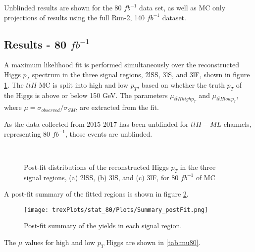 Unblinded results are shown for the 80 $fb^{-1}$ data set, as well as MC only projections of results using the full Run-2, 140 $fb^{-1}$ dataset.

\subsection{Results - 80 $fb^{-1}$}
\label{sec:res80}

A maximum likelihood fit is performed simultaneously over the reconstructed Higgs $p_T$ spectrum in the three signal regions, 2lSS, 3lS, and 3lF, shown in figure \ref{fig:sigRegions80}. The $t\bar{t}H$ MC is split into high and low $p_T$, based on whether the truth $p_T$ of the Higgs is above or below 150 GeV. The parameters $\mu_{t\bar{t}H high p_T}$ and $\mu_{t\bar{t}H low p_T}$, where $\mu = \sigma_{observed}/\sigma_{SM} $, are extracted from the fit.

As the data collected from 2015-2017 has been unblinded for $t\bar{t}H-ML$ channels, representing 80 $fb^{-1}$, those events are unblinded.

\begin{figure}[H]
    \\
    \caption{Post-fit distributions of the reconstructed Higgs $p_T$ in the three signal regions, (a) 2lSS, (b) 3lS, and (c) 3lF, for 80 $fb^{-1}$ of MC}
    \label{fig:sigRegions80}
\end{figure}

A post-fit summary of the fitted regions is shown in figure \ref{fig:Summary80}.

\begin{figure}[H]
    \center
    \texttt{[image: trexPlots/stat\_80/Plots/Summary\_postFit.png]}
    \caption{Post-fit summary of the yields in each signal region.}                                            
    \label{fig:Summary80}
\end{figure}

The $\mu$ values for high and low $p_T$ Higgs are shown in \ref{tab:mu80}.

